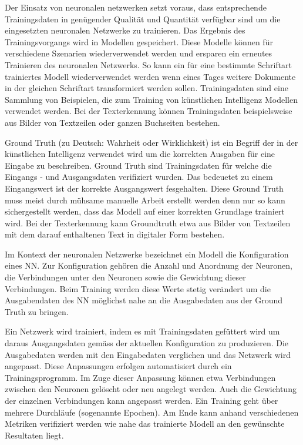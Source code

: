 \documentclass[a4paper,oneside, 12pt]{report}
\begin{document}
Der Einsatz von neuronalen netzwerken setzt voraus, dass entsprechende Trainingsdaten in genügender Qualität und Quantität verfügbar sind um die eingesetzten neuronalen Netzwerke zu trainieren. Das Ergebnis des Trainingsvorgangs wird in Modellen gespeichert. Diese Modelle können für verschiedene Szenarien wiederverwendet werden und ersparen ein erneutes Trainieren des neuronalen Netzwerks. So kann ein für eine bestimmte Schriftart trainiertes Modell wiederverwendet werden wenn eines Tages weitere Dokumente in der gleichen Schriftart transformiert werden sollen.
Trainingsdaten sind eine Sammlung von Beispielen, die zum Training von künstlichen Intelligenz Modellen verwendet werden. Bei der Texterkennung können Trainingsdaten beispielsweise aus Bilder von Textzeilen oder ganzen Buchseiten bestehen.

Ground Truth (zu Deutsch: Wahrheit oder Wirklichkeit) ist ein Begriff der in der künstlichen Intelligenz verwendet wird um die korrekten Ausgaben für eine Eingabe zu beschreiben. Ground Truth sind Trainingsdaten für welche die Eingangs - und Ausgangsdaten verifiziert wurden. Das bedeuetet zu einem Eingangswert ist der korrekte Ausgangswert fesgehalten. Diese Ground Truth muss meist durch mühsame manuelle Arbeit erstellt werden denn nur so kann sichergestellt werden, dass das Modell auf einer korrekten Grundlage trainiert wird. Bei der Texterkennung kann Groundtruth etwa aus Bilder von Textzeilen mit dem darauf enthaltenen Text in digitaler Form bestehen.

Im Kontext der neuronalen Netzwerke bezeichnet ein Modell die Konfiguration eines \ac{NN}. Zur Konfiguration gehören die Anzahl und Anordnung der Neuronen, die Verbindungen unter den Neuronen sowie die Gewichtung dieser Verbindungen. Beim Training werden diese Werte stetig verändert um die Ausgabendaten des \ac{NN} möglichst nahe an die Ausgabedaten aus der Ground Truth zu bringen.

Ein Netzwerk wird trainiert, indem es mit Trainingsdaten gefüttert wird um daraus Ausgangsdaten gemäss der aktuellen Konfiguration zu produzieren. Die Ausgabedaten werden mit den Eingabedaten verglichen und das Netzwerk wird angepasst. Diese Anpassungen erfolgen automatisiert durch ein Trainingsprogramm. Im Zuge dieser Anpassung können etwa Verbindungen zwischen den Neuronen gelöscht oder neu angelegt werden. Auch die Gewichtung der einzelnen Verbindungen kann angepasst werden. Ein Training geht über mehrere Durchläufe (sogenannte Epochen). Am Ende kann anhand verschiedenen Metriken verifiziert werden wie nahe das trainierte Modell an den gewünschte Resultaten liegt.\cite{ibmnn}
\end{document}
